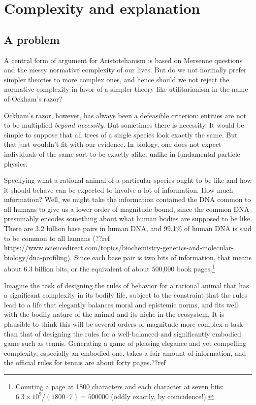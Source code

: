 
\section{Complexity and explanation}\label{sec:hierarchy}
\subsection{A problem}
A central form of argument for Aristotelianism is based on Mersenne questions and the messy normative complexity of our
lives. But do we not normally prefer simpler theories to more complex ones, and hence should we not reject the normative
complexity in favor of a simpler theory like utilitarianism in the name of Ockham's razor?

Ockham's razor, however, has always been a defeasible criterion: entities are not to be multiplied \textit{beyond necessity}.
But sometimes there is necessity. It would be simple to suppose that all trees of a single species look exactly the same.
But that just wouldn't fit with our evidence. In biology, one does not expect individuals of the same sort to be exactly
alike, unlike in fundamental particle physics. 

Specifying what a rational animal of a particular species ought to be like
and how it should behave can be expected to involve a lot of information. How much information? Well, we might take the information contained
the DNA common to all humans to give us a lower order of magnitude bound, since the common DNA presumably encodes something
about what human bodies are supposed to be like. There are 3.2 billion base pairs in human DNA, and 
99.1\% of human DNA is said to be common to all humans (??ref https://www.sciencedirect.com/topics/biochemistry-genetics-and-molecular-biology/dna-profiling).
Since each base pair is two bits of information, that means about 6.3 billion bits, or the equivalent of about 500,000
book pages.\footnote{Counting a page at 1800 characters and each character at seven bits: $6.3\times 10^9/(1800\cdot 7)=500000$
(oddly exactly, by coincidence!).} 

Imagine the task of designing the rules of behavior for a rational animal that has a significant complexity in its bodily
life, subject to the constraint that the rules lead to a life that elegantly balances moral and epistemic norms, and fits
well with the bodily nature of the animal and its niche in the ecosystem. It is plausible to think this will be several
orders of magnitude more complex a task than that of designing the rules for a well-balanced and significantly embodied game 
such as tennis. Generating a game of pleasing elegance and yet compelling complexity, especially an embodied one, takes a 
fair amount of information, and the official rules for tennis are about forty pages.??ref 

